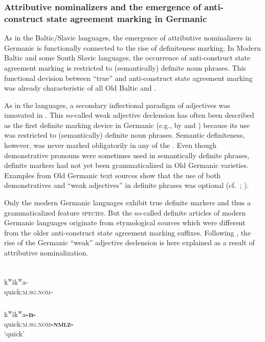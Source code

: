 \subsubsection[Germanic]{Attributive nominalizers and the emergence of anti\hyp{}construct state agreement marking in Germanic}
\label{germanic diachr}
As in the Baltic\slash{}Slavic languages, the emergence of attributive nominalizers in Germanic is functionally connected to the rise of definiteness marking. In Modern Baltic and some South Slavic languages, the occurrence of anti\hyp{}construct state agreement marking is restricted to (semantically) definite noun phrases. This functional devision between “true”  and anti\hyp{}construct state agreement marking was already characteristic of all Old Baltic and . 

As in the  languages, a secondary inflectional paradigm of adjectives was innovated in . This so-called weak adjective declension has often been described as the first definite marking device in Germanic (e.g., by \citealt{heinrichs1954} and \citealt[170]{ringe2006}) because its use was restricted to (semantically) definite noun phrases. Semantic definiteness, however, was never marked obligatorily in any of the . Even though demonstrative pronouns were sometimes used in semantically definite phrases, definite markers had not yet been grammaticalized in Old Germanic varieties. Examples from Old Germanic text sources show that the use of both demonstratives and “weak adjectives” in definite phrases was optional (cf.~\citealt{philippi1997}; \citealt{heinrichs1954}).

Only the modern Germanic languages exhibit true definite markers and thus a grammaticalized feature \textsc{species}. But the so-called definite articles of modern Germanic languages originate from etymological sources which were different from the older anti\hyp{}construct state agreement marking suffixes. Following \citet[267–268]{riesler2006a}, the rise of the Germanic “weak” adjective declension is here explained as a result of attributive nominalization. 
\begin{exe}
\begin{xlist}
\\
\gll *k\textsuperscript{w}ik\textsuperscript{w}a-\\
	quick:\textsc{m.sg.nom-}\\
\\
\gll *k\textsuperscript{w}ik\textsuperscript{w}a\textbf{-n-}\\
	quick:\textsc{m.sg.nom}\textbf{\textsc{-nmlz-}}\\
\glt	‘quick’
\end{xlist}
\end{exe}

